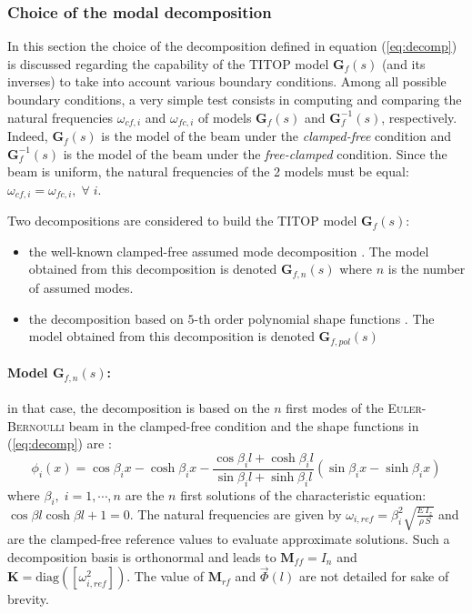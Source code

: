 \subsubsection{Choice of the modal decomposition}
In this section the choice of the decomposition defined in equation (\ref{eq:decomp}) is discussed regarding the capability of the TITOP model $\mathbf{G}_{f}(s)$  (and its inverses) to take into account various boundary conditions. Among all possible boundary conditions, a very simple test consists in computing and comparing the natural frequencies $\omega_{cf,i}$ and $\omega_{fc,i}$ of models $\mathbf{G}_{f}(s)$ and $\mathbf{G}_{f}^{-1}(s)$, respectively. Indeed, $\mathbf{G}_{f}(s)$ is the model of the beam under the \textit{clamped-free} condition and $\mathbf{G}_{f}^{-1}(s)$ is the model of the beam under the \textit{free-clamped} condition. Since the beam is uniform, the natural frequencies of the 2 models must be equal: $\omega_{cf,i}=\omega_{fc,i},\;\forall\;i$.

Two decompositions are considered to build the TITOP model  $\mathbf{G}_{f}(s)$:
\begin{itemize}
\item the well-known clamped-free assumed mode decomposition \cite{MohanSahaMSD2007}. The model obtained from this decomposition is denoted $\mathbf{G}_{f,n}(s)$ where $n$ is the number of assumed modes.
\item the decomposition based on $5$-th order polynomial shape functions \cite{Murali2015}. The model obtained from this decomposition is denoted $\mathbf{G}_{f,pol}(s)$
\end{itemize}

\paragraph{Model $\mathbf{G}_{f,n}(s)$:} in that case, the decomposition is based on the $n$ first modes of the \textsc{Euler-Bernoulli} beam in the clamped-free condition and the shape functions in (\ref{eq:decomp}) are \cite{wiki,bishop1979mechanics}:
\begin{equation}\label{eq:phiref}
\phi_i(x)=\cos\beta_i x-\cosh\beta_i x-\frac{\cos\beta_i l+\cosh\beta_i l}{\sin\beta_i l+\sinh\beta_i l}(\sin\beta_i x-\sinh\beta_i x)
\end{equation}
where $\beta_i,\;i=1,\cdots,n$ are the $n$ first solutions of the  characteristic equation:\\ $\cos\beta l\cosh\beta l+1=0$. The natural frequencies are given by $\omega_{i,ref}=\beta_i^2\sqrt{\frac{E\,I_z}{\rho\,S}}$ and are the clamped-free reference values to evaluate approximate solutions. Such a decomposition basis is orthonormal and leads to $\mathbf{M}_{ff}=I_n$ and $\mathbf{K}=\mbox{diag}([\omega_{i,ref}^2])$. The value of $\mathbf{M}_{rf}$ and $\vec{\Phi}(l)$ are not detailed for sake of brevity.

